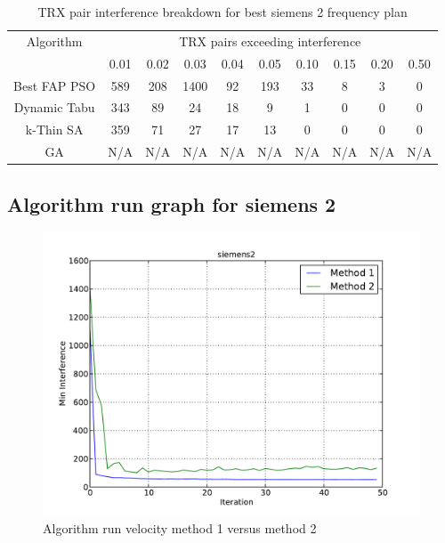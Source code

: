 \begin{table}[H]
\centering
	\begin{tabular}{cccccccccc}
	\toprule
    Algorithm & \multicolumn{9}{c}{TRX pairs exceeding interference}\\
    & 0.01 & 0.02 & 0.03 & 0.04 & 0.05 & 0.10 & 0.15 & 0.20 & 0.50 \\
    \midrule
    Best FAP PSO & 589 & 208 & 1400 & 92 & 193 & 33 & 8 & 3 & 0\\
    Dynamic Tabu & 343 & 89 & 24 & 18 & 9 & 1 & 0 & 0 & 0\\
    k-Thin SA & 359 & 71 & 27 & 17 & 13 & 0 & 0 & 0 & 0\\
    GA & \scriptsize{N/A} & \scriptsize{N/A} & \scriptsize{N/A} & \scriptsize{N/A} & \scriptsize{N/A} & \scriptsize{N/A} & \scriptsize{N/A} & \scriptsize{N/A} & \scriptsize{N/A}\\
    \bottomrule
	\end{tabular}
\caption{TRX pair interference breakdown for best siemens 2 frequency plan}
\label{tab:breakdown-siem2m1}
\end{table}

\subsection{Algorithm run graph for siemens 2}
\begin{figure}[H]
	\begin{centering}
    \includegraphics[scale=0.5]{../Implementation/data-cruncher/graph/siemens2.pdf}
	\caption{Algorithm run velocity method 1 versus method 2}
	\label{fig:siem2graph}
	\end{centering}
\end{figure}


